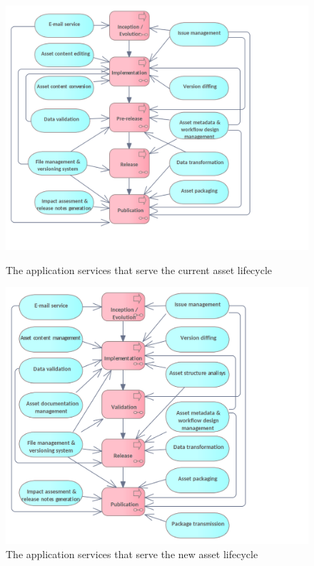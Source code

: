 	\begin{figure}
		\centering
		\begin{minipage}{0.485\textwidth}
			\centering
			\includegraphics[width=1.3\textwidth]{images/application/Application Services (current).png}
			\caption{The application services that serve the current asset lifecycle}
			\label{fig:application-current}
		\end{minipage}\hfill
		\begin{minipage}{0.485\textwidth}
			\centering
			\includegraphics[width=1.3\textwidth]{images/application/Application Services (new).png}
			\caption{The application services that serve the new asset lifecycle}
			\label{fig:application-new}
		\end{minipage}
	\end{figure}
	
